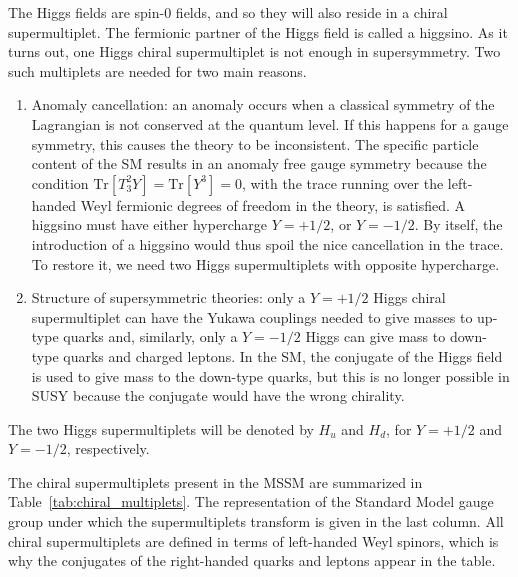 The Higgs fields are spin-0 fields, and so they will also reside in a chiral supermultiplet. The
fermionic partner of the Higgs field is called a higgsino. As it turns out, one Higgs chiral
supermultiplet is not enough in supersymmetry. Two such multiplets are needed for two main reasons. 
\begin{enumerate}
  \item Anomaly cancellation: an anomaly occurs when a classical symmetry of the Lagrangian is not
conserved at the quantum level. If this happens for a gauge symmetry, this causes the theory to be
inconsistent. The specific particle content of the SM results in an anomaly free gauge symmetry
because the condition $\text{Tr}[T^2_3 Y] = \text{Tr}[Y^3] = 0$, with the trace running over the
left-handed Weyl fermionic degrees of freedom in the theory, is satisfied. 
A higgsino must have either hypercharge $Y = +1/2$, or $Y=-1/2$. By itself, the introduction of a
higgsino would thus spoil the nice cancellation in the trace. To restore it, we need two Higgs
supermultiplets with opposite hypercharge. 

  \item Structure of supersymmetric theories: only a $Y = +1/2$ Higgs chiral supermultiplet can have
the Yukawa couplings needed to give masses to up-type quarks and, similarly, only a $Y = -1/2$ Higgs
can give mass to down-type quarks and charged leptons.
In the SM, the conjugate of the Higgs field is used to give mass to the down-type quarks, but this
is no longer possible in SUSY because the conjugate would have the wrong chirality.
\end{enumerate}
The two Higgs supermultiplets will be denoted by $H_u$ and $H_d$, for $Y = +1/2$ and $Y = -1/2$,
respectively.  

The chiral supermultiplets present in the MSSM are summarized in Table~\ref{tab:chiral_multiplets}.
The representation of the Standard Model gauge group under which the supermultiplets transform is
given in the last column.
All chiral supermultiplets are defined in terms of left-handed Weyl spinors, which is why the
conjugates of the right-handed quarks and leptons appear in the table.

